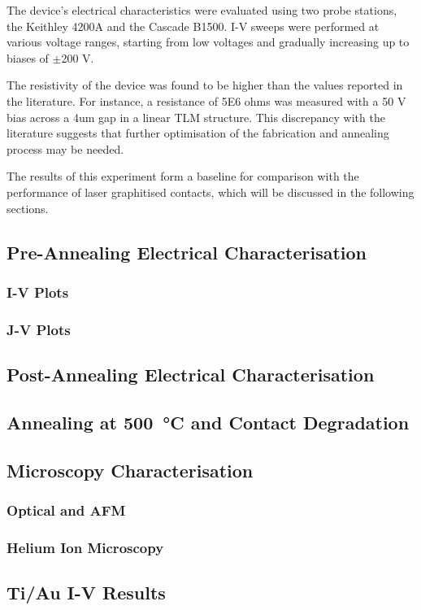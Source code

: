 The device's electrical characteristics were evaluated using two probe stations, the Keithley 4200A and the Cascade B1500. I-V sweeps were performed at various voltage ranges, starting from low voltages and gradually increasing up to biases of $\pm$200 V.

The resistivity of the device was found to be higher than the values reported in the literature. For instance, a resistance of 5E6 ohms was measured with a 50 V bias across a 4um gap in a linear TLM structure. This discrepancy with the literature suggests that further optimisation of the fabrication and annealing process may be needed.

The results of this experiment form a baseline for comparison with the performance of laser graphitised contacts, which will be discussed in the following sections.

\subsection{Pre-Annealing Electrical Characterisation}
\subsubsection{I-V Plots}

\subsubsection{J-V Plots}
\subsection{Post-Annealing Electrical Characterisation}

\subsection{Annealing at \SI{500}{\celsius} and Contact Degradation}
\subsection{Microscopy Characterisation}
\subsubsection{Optical and AFM}
\subsubsection{Helium Ion Microscopy}
\subsection{Ti/Au I-V Results}
